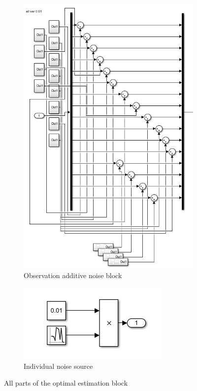 \documentclass[conf]{new-aiaa}
\begin{document}
\begin{doublespace}
\begin{figure}[!h]
\begin{subfigure}{.33\textwidth}
  \includegraphics[scale= 0.35]{obsnoise.png}
  \caption{Observation additive noise block}
  \label{obsnoise}
\end{subfigure}
\begin{subfigure}{.33\textwidth}
  \centering
  \includegraphics[scale= 0.5]{noise.png}
  \caption{Individual noise source}
  \label{noise}
\end{subfigure}
\caption{All parts of the optimal estimation block}
\label{ekfshit}
\end{figure}


\end{doublespace}
\end{document}
